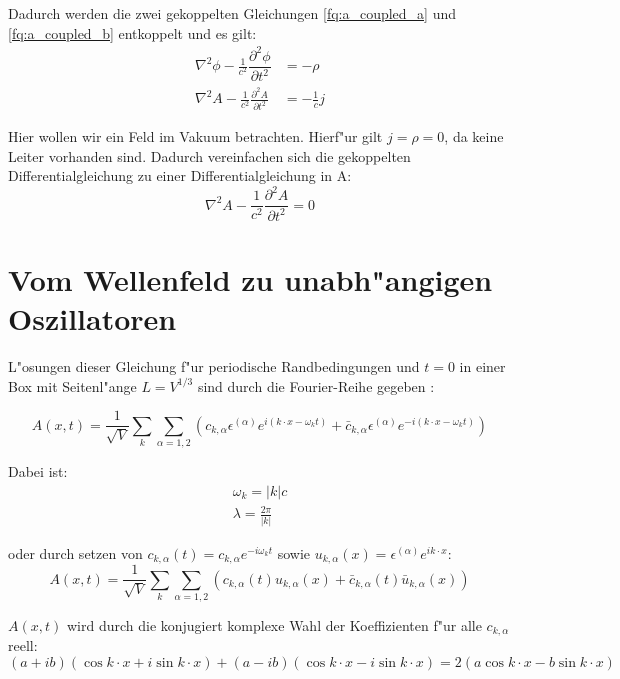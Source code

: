 Dadurch werden die zwei gekoppelten Gleichungen \ref{fq:a_coupled_a} und \ref{fq:a_coupled_b} entkoppelt und es gilt:
\begin{align*}
\nabla^2 \phi - \frac{1}{c^2} \dfrac{\partial^2 \phi}{\partial t^2} &= -\rho \\
\nabla^2 A - \frac{1}{c^2} \frac{\partial^2 A }{\partial t^2} &= - \frac{1}{c} j
\end{align*}

Hier wollen wir ein Feld im Vakuum betrachten. Hierf"ur gilt $j = \rho = 0$, da keine Leiter vorhanden sind.
Dadurch vereinfachen sich die gekoppelten Differentialgleichung zu einer Differentialgleichung in A:
\begin{equation} \label{fq:wave_dgl}
\nabla^2 A - \frac{1}{c^2} \frac{\partial^2 A }{\partial t^2} = 0
\end{equation}

\section{Vom Wellenfeld zu unabh"angigen Oszillatoren}
L"osungen dieser Gleichung f"ur periodische Randbedingungen und $t=0$ in einer Box mit Seitenl"ange $L = V^{1/3}$ sind durch die Fourier-Reihe gegeben \cite{fq:em_wave_eq}:

\begin{equation} \label{fq:wave_eq}
A(x,t) = \frac{1}{\sqrt{V}} \sum_k \sum_{\alpha=1,2} \left(c_{k,\alpha} \epsilon^{(\alpha)} e^{i (k \cdot x - \omega_k t)} + \bar{c}_{k,\alpha} \epsilon^{(\alpha)} e^{-i(k \cdot x - \omega_k t)}\right)
\end{equation}

Dabei ist:
\begin{align*}
\omega_k=|k|c \\
\lambda = \frac{2 \pi}{|k|}
\end{align*}

oder durch setzen von $c_{k,\alpha}(t) = c_{k,\alpha} e^{-i \omega_k t}$ sowie $u_{k,\alpha}(x) = \epsilon^{(\alpha)} e^{ik \cdot x}$:
\begin{equation*}
A(x,t) = \frac{1}{\sqrt{V}} \sum_k \sum_{\alpha=1,2} \left(c_{k,\alpha}(t)u_{k,\alpha}(x) + \bar{c}_{k,\alpha}(t) \bar{u}_{k,\alpha}(x) \right)
\end{equation*}

$A(x,t)$ wird durch die konjugiert komplexe Wahl der Koeffizienten f"ur alle $c_{k,\alpha}$ reell:
\begin{equation*}
(a + ib)(\cos k \cdot x + i \sin k \cdot x ) + (a - ib)(\cos k \cdot x - i \sin k \cdot x ) = 2 ( a \cos k \cdot x - b \sin k \cdot x )
\end{equation*}


